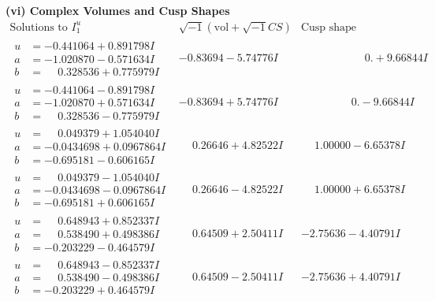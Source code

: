 \documentclass[1p]{elsarticle_modified}
\theoremstyle{definition}
\newcommand{\I}{\sqrt{-1}}
\begin{document}
\newpage\flushleft \textbf{(vi) Complex Volumes and Cusp Shapes}
$$\begin{array}{c|c|c}  
\text{Solutions to }I^u_{1}& \I (\text{vol} + \sqrt{-1}CS) & \text{Cusp shape}\\
 \hline 
\begin{aligned}
u &= -0.441064 + 0.891798 I \\
a &= -1.020870 - 0.571634 I \\
b &= \phantom{-}0.328536 + 0.775979 I\end{aligned}
 & -0.83694 - 5.74776 I & \phantom{-0.000000 -}0. + 9.66844 I \\ \hline\begin{aligned}
u &= -0.441064 - 0.891798 I \\
a &= -1.020870 + 0.571634 I \\
b &= \phantom{-}0.328536 - 0.775979 I\end{aligned}
 & -0.83694 + 5.74776 I & \phantom{-0.000000 } 0. - 9.66844 I \\ \hline\begin{aligned}
u &= \phantom{-}0.049379 + 1.054040 I \\
a &= -0.0434698 + 0.0967864 I \\
b &= -0.695181 - 0.606165 I\end{aligned}
 & \phantom{-}0.26646 + 4.82522 I & \phantom{-}1.00000 - 6.65378 I \\ \hline\begin{aligned}
u &= \phantom{-}0.049379 - 1.054040 I \\
a &= -0.0434698 - 0.0967864 I \\
b &= -0.695181 + 0.606165 I\end{aligned}
 & \phantom{-}0.26646 - 4.82522 I & \phantom{-}1.00000 + 6.65378 I \\ \hline\begin{aligned}
u &= \phantom{-}0.648943 + 0.852337 I \\
a &= \phantom{-}0.538490 + 0.498386 I \\
b &= -0.203229 - 0.464579 I\end{aligned}
 & \phantom{-}0.64509 + 2.50411 I & -2.75636 - 4.40791 I \\ \hline\begin{aligned}
u &= \phantom{-}0.648943 - 0.852337 I \\
a &= \phantom{-}0.538490 - 0.498386 I \\
b &= -0.203229 + 0.464579 I\end{aligned}
 & \phantom{-}0.64509 - 2.50411 I & -2.75636 + 4.40791 I \\ \hline\begin{aligned}

\end{aligned}
\end{array}$$
\end{document}
